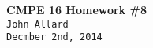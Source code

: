 \documentclass[a4paper,11pt]{article}
\begin{document}
   \begin{center}
      \Large\textbf{CMPE 16 Homework \#8}\\
      \large\texttt{John Allard} \\
      \small\texttt{Decmber 2nd, 2014}
   \end{center}

\end{document}
